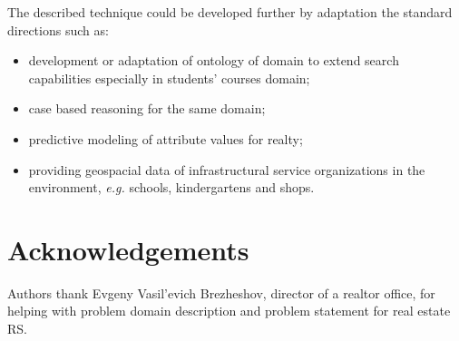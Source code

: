 \documentclass[conference]{IEEEtran}
\begin{document}
The described technique could be developed further by adaptation the standard directions such as:
\begin{itemize}
  \item development or adaptation of ontology of domain to extend search capabilities especially in students' courses domain;
  \item case based reasoning for the same domain;
  \item predictive modeling of attribute values for realty;
  \item providing geospacial data of infrastructural service organizations in the environment, \emph{e.g.} schools, kindergartens and shops.
\end{itemize}

\section*{Acknowledgements}
\label{sec:ack}

Authors thank Evgeny Vasil'evich Brezheshov, director of a realtor office, for helping with problem domain description and problem statement for real estate RS.

\end{document}
